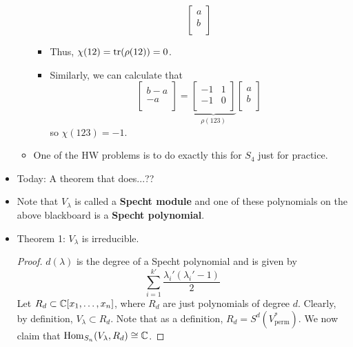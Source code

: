 \documentclass[../notes.tex]{subfiles}
\begin{document}
\begin{itemize}
\begin{itemize}
\begin{itemize}
\begin{equation*}
                \begin{bmatrix}
                    a\\
                    b\\
                \end{bmatrix}
            \end{equation*}
            \item Thus, $\chi(12)=\tr(\rho(12))=0$.
            \item Similarly, we can calculate that
            \begin{equation*}
                \begin{bmatrix}
                    b-a\\
                    -a\\
                \end{bmatrix}
                = \underbrace{
                    \begin{bmatrix}
                        -1 & 1\\
                        -1 & 0\\
                    \end{bmatrix}
                }_{\rho(123)}
                \begin{bmatrix}
                    a\\
                    b\\
                \end{bmatrix}
            \end{equation*}
            so $\chi(123)=-1$.
        \end{itemize}
        \item One of the HW problems is to do exactly this for $S_4$ just for practice.
    \end{itemize}
    \item Today: A theorem that does...??
    \item Note that $V_\lambda$ is called a \textbf{Specht module} and one of these polynomials on the above blackboard is a \textbf{Specht polynomial}.
    \item Theorem 1: $V_\lambda$ is irreducible.
    \begin{proof}
        $d(\lambda)$ is the degree of a Specht polynomial and is given by
        \begin{equation*}
            \sum_{i=1}^{k'}\frac{\lambda_i'(\lambda_i'-1)}{2}
        \end{equation*}
        Let $R_d\subset\mathbb{C}[x_1,\dots,x_n]$, where $R_d$ are just polynomials of degree $d$.
        Clearly, by definition, $V_\lambda\subset R_d$. Note that as a definition, $R_d=S^d(V_\text{perm}^*)$.
        We now claim that $\operatorname{Hom}_{S_n}(V_\lambda,R_d)\cong\mathbb{C}$.


\end{proof}
\end{itemize}
\end{document}

